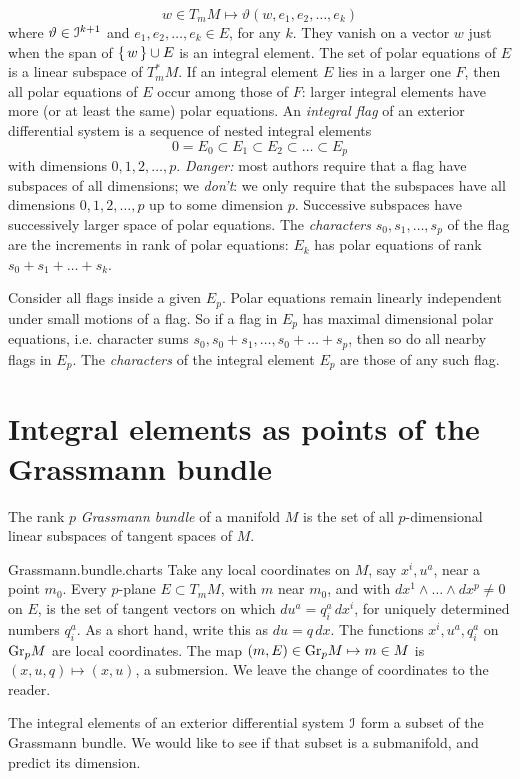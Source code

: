 \[
w \in T_m M \mapsto \vartheta(w,e_1,e_2,\dots,e_k)
\]
where \(\vartheta\in\mathcal{I}^{k+1}\) and \(e_1,e_2,\dots,e_k\in E\), for any \(k\).
They vanish on a vector \(w\) just when the span of \(\set{w}\cup E\) is an integral element.
The set of polar equations of \(E\) is a linear subspace of \(T_m^* M\).
If an integral element \(E\) lies in a larger one \(F\), then all polar equations of \(E\) occur among those of \(F\): larger integral elements have more (or at least the same) polar equations.
An \emph{integral flag} of an exterior differential system is a sequence of nested integral elements
\[
0=E_0 \subset E_1 \subset E_2 \subset \dots \subset E_p
\]
with dimensions \(0,1,2,\dots,p\).
\emph{Danger:} most authors require that a flag have subspaces of all dimensions; we \emph{don't}: we only require that the subspaces have all dimensions \(0,1,2,\dots,p\) up to some dimension \(p\).
Successive subspaces have successively larger space of polar equations.
The \emph{characters} \(s_0,s_1,\dots,s_p\) of the flag are the increments in rank of polar equations: \(E_k\) has polar equations of rank \(s_0+s_1+\dots+s_k\).

Consider all flags inside a given \(E_p\).
Polar equations remain linearly independent under small motions of a flag.
So if a flag in \(E_p\) has maximal dimensional polar equations, i.e. character sums \(s_0,s_0+s_1,\dots,s_0+\dots+s_p\),  then so do all nearby flags in \(E_p\).   
The \emph{characters} of the integral element \(E_p\) are those of any such flag.

\section{Integral elements as points of the Grassmann bundle}
The rank \(p\) \emph{Grassmann bundle} of a manifold \(M\) is the set of all \(p\)-dimensional linear subspaces of tangent spaces of \(M\).
%
\begin{answer}{Grassmann.bundle.charts}%
Take any local coordinates on \(M\), say \(x^i,u^a\), near a point \(m_0\).
Every \(p\)-plane \(E \subset T_m M\), with \(m\) near \(m_0\), and with \(dx^1\wedge \dots \wedge dx^p \ne 0\) on \(E\), is the set of tangent vectors on which \(du^a = q^a_i \, dx^i\), for uniquely determined numbers \(q^a_i\).
As a short hand, write this as \(du=q \, dx\).
The functions \(x^i,u^a,q^a_i\) on \(\operatorname{Gr}_{p}\!M\) are local coordinates.
The map \((m,E)\in\operatorname{Gr}_{p}\!M \mapsto m\in M\) is \((x,u,q)\mapsto (x,u)\), a submersion.
We leave the change of coordinates to the reader.%
\end{answer}
The integral elements of an exterior differential system \(\mathcal{I}\) form a subset of the Grassmann bundle.
We would like to see if that subset is a submanifold, and predict its dimension.

